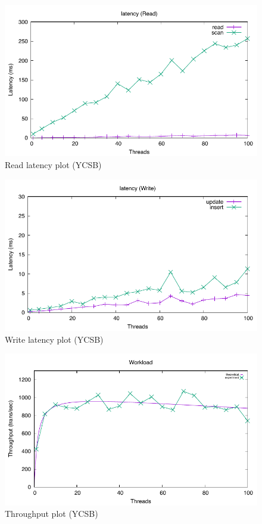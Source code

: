 \documentclass[runningheads]{llncs}
\begin{document}
\begin{figure}
\centering
\includegraphics[scale=0.8]{images/latency 1.pdf}
\caption{Read latency plot (YCSB)}
\end{figure}

\begin{figure}
\centering
\includegraphics[scale=0.8]{images/latency 2.pdf}
\caption{Write latency plot (YCSB)}
\end{figure}

\begin{figure}
\centering
\includegraphics[scale=0.8]{images/throughput.pdf}
\caption{Throughput plot (YCSB)}
\end{figure}
\end{document}
